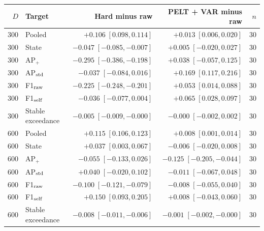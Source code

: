\begin{tabular}{rlrrr}
\toprule
$D$ & Target & Hard minus raw & PELT + VAR minus raw & $n$ \\
\midrule
300 & Pooled & $+0.106\;[0.098,0.114]$ & $+0.013\;[0.006,0.020]$ & 30 \\
300 & State & $-0.047\;[-0.085,-0.007]$ & $+0.005\;[-0.020,0.027]$ & 30 \\
300 & AP$_+$ & $-0.295\;[-0.386,-0.198]$ & $+0.038\;[-0.057,0.125]$ & 30 \\
300 & AP$_{\rm std}$ & $-0.037\;[-0.084,0.016]$ & $+0.169\;[0.117,0.216]$ & 30 \\
300 & F1$_{\rm raw}$ & $-0.225\;[-0.248,-0.201]$ & $+0.053\;[0.014,0.088]$ & 30 \\
300 & F1$_{\rm self}$ & $-0.036\;[-0.077,0.004]$ & $+0.065\;[0.028,0.097]$ & 30 \\
300 & Stable exceedance & $-0.005\;[-0.009,-0.000]$ & $-0.000\;[-0.002,0.002]$ & 30 \\
600 & Pooled & $+0.115\;[0.106,0.123]$ & $+0.008\;[0.001,0.014]$ & 30 \\
600 & State & $+0.037\;[0.003,0.067]$ & $-0.006\;[-0.020,0.008]$ & 30 \\
600 & AP$_+$ & $-0.055\;[-0.133,0.026]$ & $-0.125\;[-0.205,-0.044]$ & 30 \\
600 & AP$_{\rm std}$ & $+0.040\;[-0.020,0.102]$ & $-0.011\;[-0.067,0.048]$ & 30 \\
600 & F1$_{\rm raw}$ & $-0.100\;[-0.121,-0.079]$ & $-0.008\;[-0.055,0.040]$ & 30 \\
600 & F1$_{\rm self}$ & $+0.150\;[0.093,0.205]$ & $+0.008\;[-0.043,0.060]$ & 30 \\
600 & Stable exceedance & $-0.008\;[-0.011,-0.006]$ & $-0.001\;[-0.002,-0.000]$ & 30 \\
\bottomrule
\end{tabular}
